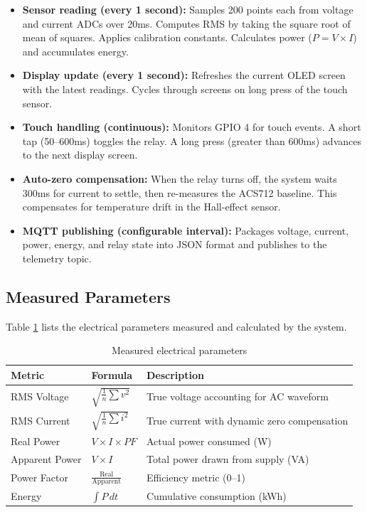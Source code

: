 \documentclass[12pt, a4paper]{article}
\begin{document}
	\begin{itemize}
	\item \textbf{Sensor reading (every 1 second):} Samples 200 points each from voltage and current ADCs over 20ms. Computes RMS by taking the square root of mean of squares. Applies calibration constants. Calculates power ($P = V \times I$) and accumulates energy.
	
	\item \textbf{Display update (every 1 second):} Refreshes the current OLED screen with the latest readings. Cycles through screens on long press of the touch sensor.
	
	\item \textbf{Touch handling (continuous):} Monitors GPIO 4 for touch events. A short tap (50--600ms) toggles the relay. A long press (greater than 600ms) advances to the next display screen.
	
	\item \textbf{Auto-zero compensation:} When the relay turns off, the system waits 300ms for current to settle, then re-measures the ACS712 baseline. This compensates for temperature drift in the Hall-effect sensor.
	
	\item \textbf{MQTT publishing (configurable interval):} Packages voltage, current, power, energy, and relay state into JSON format and publishes to the telemetry topic.
	\end{itemize}
	
	\newpage
	\subsection{Measured Parameters}
	
	Table \ref{tab:params} lists the electrical parameters measured and calculated by the system.
	
	\begin{table}[H]
		\centering
		\caption{Measured electrical parameters}
		\label{tab:params}
		\vspace{6pt}
		\begin{tabular}{|l|l|p{6cm}|}
			\hline
			\textbf{Metric} & \textbf{Formula} & \textbf{Description} \\
			\hline
			RMS Voltage & $\sqrt{\frac{1}{n}\sum v^2}$ & True voltage accounting for AC waveform \\
			RMS Current & $\sqrt{\frac{1}{n}\sum i^2}$ & True current with dynamic zero compensation \\
			Real Power & $V \times I \times PF$ & Actual power consumed (W) \\
			Apparent Power & $V \times I$ & Total power drawn from supply (VA) \\
			Power Factor & $\frac{\text{Real}}{\text{Apparent}}$ & Efficiency metric (0--1) \\
			Energy & $\int P \, dt$ & Cumulative consumption (kWh) \\
			\hline
		\end{tabular}
	\end{table}
	
\end{document}
